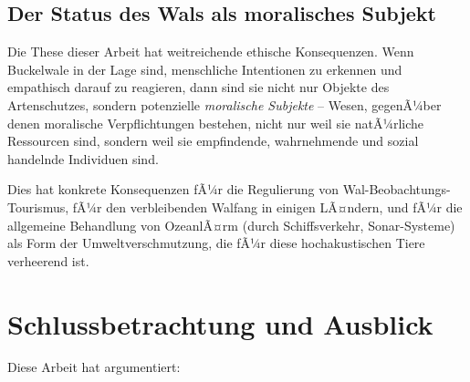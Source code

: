 ﻿\documentclass[12pt,a4paper]{article}
\theoremstyle{definition}
\theoremstyle{remark}
\begin{document}
\subsection{Der Status des Wals als moralisches Subjekt}

Die These dieser Arbeit hat weitreichende ethische Konsequenzen. Wenn
Buckelwale in der Lage sind, menschliche Intentionen zu erkennen und
empathisch darauf zu reagieren, dann sind sie nicht nur Objekte des
Artenschutzes, sondern potenzielle \emph{moralische Subjekte} -- Wesen,
gegenÃ¼ber denen moralische Verpflichtungen bestehen, nicht nur weil sie
natÃ¼rliche Ressourcen sind, sondern weil sie empfindende, wahrnehmende
und sozial handelnde Individuen sind.

Dies hat konkrete Konsequenzen fÃ¼r die Regulierung von Wal-Beobachtungs-Tourismus,
fÃ¼r den verbleibenden Walfang in einigen LÃ¤ndern, und fÃ¼r die allgemeine
Behandlung von OzeanlÃ¤rm (durch Schiffsverkehr, Sonar-Systeme) als Form
der Umweltverschmutzung, die fÃ¼r diese hochakustischen Tiere verheerend ist.

\section{Schlussbetrachtung und Ausblick}
\label{sec:schluss}

Diese Arbeit hat argumentiert:
\end{document}
